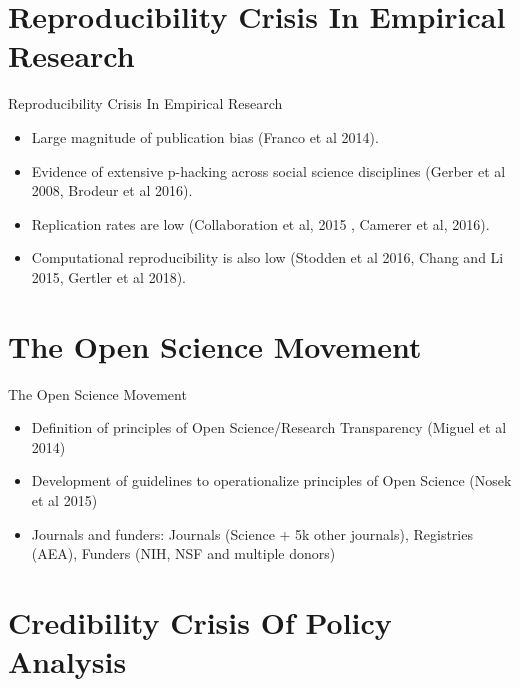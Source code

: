 \documentclass{beamer}
\begin{document}
\section[Crisis in Research]{Reproducibility Crisis In Empirical Research}

\begin{frame}{Reproducibility Crisis In Empirical Research}

\begin{itemize}
\item Large magnitude of publication bias (Franco et al 2014).  
\item Evidence of extensive p-hacking across social science disciplines (Gerber et al 2008, Brodeur et al 2016).
\item Replication rates are low (Collaboration et al, 2015 , Camerer et al, 2016). 
\item Computational reproducibility is also low (Stodden et al 2016, Chang and Li 2015, Gertler et al 2018).
\end{itemize}

\end{frame} 


\section[Open Science]{The Open Science Movement}

\begin{frame}{The Open Science Movement}

\begin{itemize}
\item Definition of principles of Open Science/Research Transparency (Miguel et al 2014)
\item Development of guidelines to operationalize principles of Open Science (Nosek et al 2015)
\item Journals and funders: Journals (Science + 5k other journals), Registries (AEA), Funders (NIH, NSF and multiple donors)
\end{itemize}

\end{frame} 

\section[Crisis in PA]{Credibility Crisis Of Policy Analysis}
\end{document}
